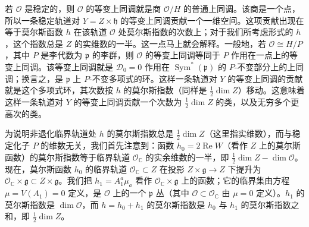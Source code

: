 \documentclass[11pt,a4paper,UTF8]{ctexart}
\theoremstyle{plain}
\theoremstyle{definition}
\begin{document}
若 $\mathcal O$ 是稳定的，则 $\mathcal O$ 的等变上同调就是商 $\mathcal O/H$ 的普通上同调。该商是一个点，所以一条稳定轨道对 $Y=Z\times\mathfrak h$ 的等变上同调贡献一个一维空间。这项贡献出现在等于莫尔斯函数 $h$ 在该轨道 $\mathcal O$ 处莫尔斯指数的次数上；对于我们所考虑形式的 $h$，这个指数总是 $Z$ 的实维数的一半。这一点马上就会解释。一般地，若 $\mathcal O\cong H/P$，其中 $P$ 是李代数为 $\mathfrak p$ 的李群，则 $\mathcal O$ 的等变上同调等同于 $P$ 作用在一点上的等变上同调。该等变上同调就是 $\mathcal D_0=0$ 作用在 $\operatorname{Sym}^*(\mathfrak p)$ 的 $P$-不变部分上的上同调；换言之，是 $\mathfrak p$ 上 $P$-不变多项式的环。这样一条轨道对 $Y$ 的等变上同调的贡献就是这个多项式环，其次数按 $h$ 的莫尔斯指数（同样是 $\frac12\dim Z$）移动。这意味着这样一条轨道对 $Y$ 的等变上同调贡献一个次数为 $\frac12\dim Z$ 的类，以及无穷多个更高次的类。

为说明非退化临界轨道处 $h$ 的莫尔斯指数总是 $\frac12\dim Z$（这里指实维数），而与稳定化子 $P$ 的维数无关，我们首先注意到：函数 $h_0=2\operatorname{Re}W$（看作 $Z$ 上的莫尔斯函数）的莫尔斯指数等于临界轨道 $\mathcal O_{\mathbb C}$ 的实余维数的一半，即 $\frac12\dim Z-\dim\mathcal O$。现在，莫尔斯函数 $h_0$ 的临界轨道 $\mathcal O_{\mathbb C}\subset Z$ 在投影 $Z\times\mathfrak g\to Z$ 下提升为 $\mathcal O_{\mathbb C}\times\mathfrak g\subset Z\times\mathfrak g$。我们把 $h_1=A_1^a\mu_a$ 看作 $\mathcal O_{\mathbb C}\times\mathfrak g$ 上的函数；它的临界集由方程 $\mu=V(A_1)=0$ 定义，是 $\mathcal O$ 上的一个 $\mathfrak p$ 丛（其中 $\mathcal O\subset\mathcal O_{\mathbb C}$ 由 $\mu=0$ 定义）。$h_1$ 的莫尔斯指数是 $\dim\mathcal O$，而 $h=h_0+h_1$ 的莫尔斯指数是 $h_0$ 与 $h_1$ 的莫尔斯指数之和，即 $\frac12\dim Z$。

\end{document}
